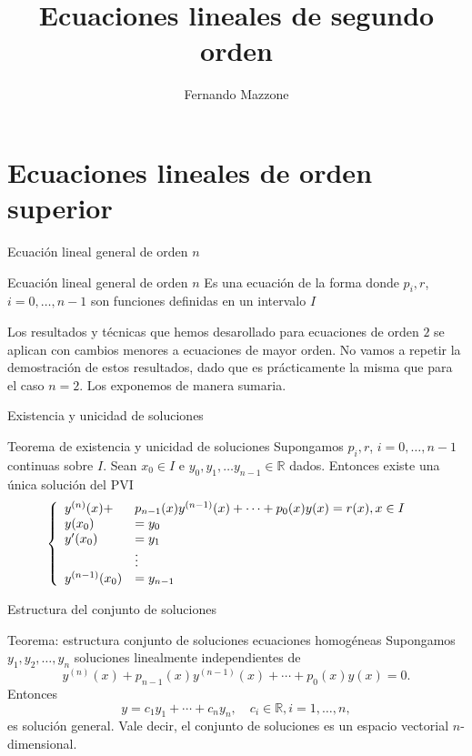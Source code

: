 \documentclass[handout,hyperref={colorlinks=true}]{beamer}
\title[Ecuaciones lineales de segundo orden] %
{%
 Ecuaciones lineales de segundo orden
}
\author[] %
{Fernando Mazzone}
\institute%
{
 Depto de Matemática\\
Facultad de Ciencias Exactas Físico-Químicas y Naturales\\
Universidad Nacional de Río Cuarto}
\newcommand{\rr}{\mathbb{R}}
\begin{document}
\section{Ecuaciones lineales de orden superior}

\begin{frame}{Ecuación lineal general de orden $n$}
\begin{block}{Ecuación lineal general de orden $n$}
Es una ecuación de la forma
donde $p_i,r$, $i=0,\ldots,n-1$ son funciones definidas en un intervalo $I$
\end{block}


Los resultados y técnicas que hemos desarollado para ecuaciones de orden $2$ se aplican con cambios menores a ecuaciones de mayor orden. No vamos a repetir la demostración de estos resultados, dado que es prácticamente la misma que para el caso $n=2$. Los exponemos de manera sumaria.
\end{frame}

\begin{frame}{Existencia y unicidad de soluciones}
\begin{block}{Teorema de existencia y unicidad de soluciones}
 Supongamos $p_i,r$, $i=0,\ldots,n-1$ continuas sobre $I$. Sean $x_0\in I$ e $y_0,y_1,\ldots y_{n-1}\in\rr$ dados. Entonces existe una única solución del PVI
 \[\left\{
 \begin{array}{l l l}
   y^{(n)}(x)+&p_{n-1}(x)y^{(n-1)}(x)+\cdots+p_0(x)y(x)=r(x),x\in I\\
   y(x_0)&=y_0&\\
   y'(x_0)&=y_1&\\
   &\vdots\\
  y^{(n-1)}(x_0)&=y_{n-1}&\\
  \end{array}\right.
\]

\end{block}
\end{frame}

\begin{frame}{Estructura del conjunto de soluciones}

\begin{block}{Teorema: estructura conjunto de soluciones ecuaciones homogéneas}
Supongamos $y_1,y_2,\ldots,y_n$ soluciones linealmente independientes de 
\[y^{(n)}(x)+p_{n-1}(x)y^{(n-1)}(x)+\cdots+p_0(x)y(x)=0.\]
Entonces 
\[y=c_1y_1+\cdots+c_ny_n,\quad c_i\in\rr, i=1,\ldots,n,\]
es solución general. Vale decir, el conjunto de soluciones es un espacio vectorial $n$-dimensional.
\end{block}
\end{frame}
\end{document}
